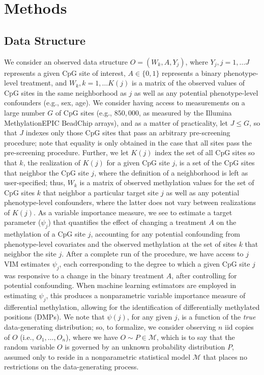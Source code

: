 \documentclass[9pt,a4paper,]{extarticle}
\theoremstyle{definition}
\theoremstyle{definition}
\theoremstyle{definition}
\theoremstyle{remark}
\begin{document}
\hypertarget{methods}{%
\section{Methods}\label{methods}}

\hypertarget{data-structure}{%
\subsection{Data Structure}\label{data-structure}}

We consider an observed data structure \(O = (W_k, A, Y_j)\), where \(Y_j, j = 1, \ldots J\) represents a given CpG site of interest, \(A \in \{0, 1\}\) represents a
binary phenotype-level treatment, and \(W_k, k = 1, \ldots K(j)\) is a matrix of
the observed values of CpG sites in the same neighborhood as \(j\) as well as any
potential phenotype-level confounders (e.g., sex, age). We consider having
access to measurements on a large number \(G\) of CpG sites (e.g., \(850,000\), as
measured by the Illumina MethylationEPIC BeadChip arrays), and as a matter of
practicality, let \(J \leq G\), so that \(J\) indexes only those CpG sites that pass
an arbitrary pre-screening procedure; note that equality is only obtained in the
case that all sites pass the pre-screening procedure. Further, we let \(K(j)\)
index the set of all CpG sites so that \(k\), the realization of \(K(j)\) for a
given CpG site \(j\), is a set of the CpG sites that neighbor the CpG site \(j\),
where the definition of a neighborhood is left as user-specified; thus, \(W_k\) is
a matrix of observed methylation values for the set of CpG sites \(k\) that
neighbor a particular target site \(j\) as well as any potential phenotype-level
confounders, where the latter does not vary between realizations of \(K(j)\). As
a variable importance measure, we see to estimate a target parameter (\(\psi_j\))
that quantifies the effect of changing a treatment \(A\) on the methylation of a
CpG site \(j\), accounting for any potential confounding from phenotype-level
covariates and the observed methylation at the set of sites \(k\) that neighbor
the site \(j\). After a complete run of the procedure, we have access to \(j\) VIM
estimates \(\psi_j\), each corresponding to the degree to which a given CpG site
\(j\) was responsive to a change in the binary treatment \(A\), after controlling
for potential confounding. When machine learning estimators are employed in
estimating \(\psi_j\), this produces a nonparametric variable importance measure
of differential methylation, allowing for the identification of differentially
methylated positions (DMPs). We note that \(\psi(j)\), for any given \(j\), is a
function of the \emph{true} data-generating distribution; so, to formalize, we
consider observing \(n\) iid copies of \(O\) (i.e., \(O_1, \ldots, O_n\)), where we
have \(O \sim P \in \mathcal{M}\), which is to say that the random variable \(O\) is
governed by an unknown probability distribution \(P\), assumed only to reside in a
nonparametric statistical model \(\mathcal{M}\) that places no restrictions on the
data-generating process.
\end{document}
